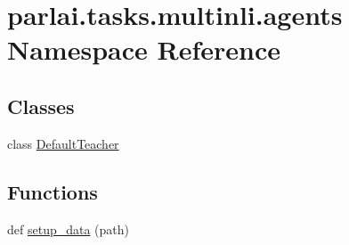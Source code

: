 \hypertarget{namespaceparlai_1_1tasks_1_1multinli_1_1agents}{}\section{parlai.\+tasks.\+multinli.\+agents Namespace Reference}
\label{namespaceparlai_1_1tasks_1_1multinli_1_1agents}
\subsection*{Classes}
\begin{DoxyCompactItemize}
\item 
class \hyperlink{classparlai_1_1tasks_1_1multinli_1_1agents_1_1DefaultTeacher}{Default\+Teacher}
\end{DoxyCompactItemize}
\subsection*{Functions}
\begin{DoxyCompactItemize}
\item 
def \hyperlink{namespaceparlai_1_1tasks_1_1multinli_1_1agents_a4fa2cb0ba1ed745336ad8bceed36b841}{setup\+\_\+data} (path)
\end{DoxyCompactItemize}
